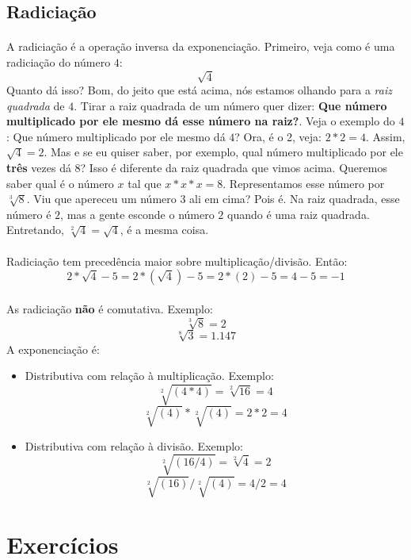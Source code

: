\documentclass{article}
\begin{document}
\subsection{Radiciação}
\paragraph{}
A radiciação é a operação inversa da exponenciação. 
Primeiro, veja como é uma radiciação do número $4$:
$$\sqrt{4}$$
Quanto dá isso? Bom, do jeito que está acima, nós estamos olhando para a 
\textit{raiz quadrada} de $4$. Tirar a raiz quadrada de um número quer dizer:
\textbf{Que número multiplicado por ele mesmo dá esse número na raiz?}. Veja
o exemplo do $4$: Que número multiplicado por ele mesmo dá $4$? Ora, é o 2,
veja: $2*2 = 4$. Assim, $\sqrt{4} = 2$.
Mas e se eu quiser saber, por exemplo, qual número multiplicado por ele 
\textbf{três} vezes dá $8$? Isso é diferente da raiz quadrada que vimos acima.
Queremos saber qual é o número $x$ tal que $x*x*x = 8$. Representamos esse
número por $\sqrt[3]{8}$. Viu que apereceu um número 3 ali em cima? Pois é. Na
raiz quadrada, esse número é $2$, mas a gente esconde o número $2$ quando é uma
raiz quadrada. Entretando, $\sqrt[2]{4} = \sqrt{4}$, é a mesma coisa.
\paragraph{}
Radiciação tem precedência maior sobre multiplicação/divisão. Então:
$$2 * \sqrt{4} - 5 = 2 * (\sqrt{4}) - 5 = 2 * (2) - 5 = 4 - 5 = -1$$
\paragraph{}
As radiciação \textbf{não} é comutativa. Exemplo:
$$\sqrt[3]{8} = 2$$
$$\sqrt[8]{3} = 1.147$$
A exponenciação é:
\begin{itemize}
\item Distributiva com relação à multiplicação. Exemplo:
$$\sqrt[2]{(4*4)} = \sqrt[2]{16} = 4$$
$$\sqrt[2]{(4)}*\sqrt[2]{(4)} = 2*2 = 4$$
\item Distributiva com relação à divisão. Exemplo:
$$\sqrt[2]{(16/4)} = \sqrt[2]{4} = 2$$
$$\sqrt[2]{(16)}/\sqrt[2]{(4)} = 4/2 = 4$$
\end{itemize}

\section{Exercícios}
\end{document}
